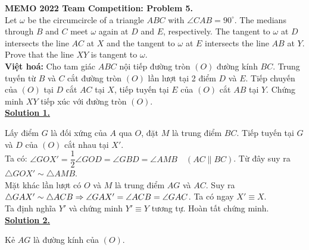 \documentclass[12pt,a4paper]{article}
\begin{document}
\setlength{\parindent}{0pt}
	
\textbf{MEMO 2022 Team Competition: Problem 5.} \\

Let $\omega$ be the circumcircle of a triangle $ABC$ with $\angle CAB=90^{\circ}$. The medians through $B$ and $C$ meet $\omega$ again at $D$ and $E$, respectively. The tangent to $\omega$ at $D$ intersects the line $AC$ at $X$ and the tangent to $\omega$ at $E$ intersects the line $AB$ at $Y$. Prove that the line $XY$ is tangent to $\omega$.\\

\textbf{Việt hoá:} Cho tam giác $ABC$ nội tiếp đường tròn $(O)$ đường kính $BC$. Trung tuyến từ $B$ và $C$ cắt đường tròn $(O)$ lần lượt tại 2 điểm $D$ và $E$. Tiếp chuyến của $(O)$ tại $D$ cắt $AC$ tại $X$, tiếp tuyến tại $E$ của $(O)$ cắt $AB$ tại $Y$. Chứng minh $XY$ tiếp xúc với đường tròn $(O)$.\\

\textbf{\underline{Solution 1.}}

Lấy điểm $G$ là đối xứng của $A$ qua $O$, đặt $M$ là trung điểm $BC$. Tiếp tuyến tại $G$ và $D$ của $(O)$ cắt nhau tại $X'$.\\

Ta có: $\angle GOX'=\dfrac{1}{2}\angle GOD=\angle GBD=\angle AMB\quad(AC\parallel BC)$. Từ đây suy ra $\triangle GOX'\sim\triangle AMB$. \\

Mặt khác lần lượt có $O$ và $M$ là trung điểm $AG$ và $AC$. Suy ra $\triangle GAX'\sim\triangle ACB\newline\Rightarrow\angle GAX'=\angle ACB=\angle GAC$. Ta có ngay $X'\equiv X$.\\

Ta định nghĩa $Y'$ và chứng minh $Y'\equiv Y$ tương tự. Hoàn tất chứng minh.\bigskip\\

\textbf{\underline{Solution 2.}}

Kẻ $AG$ là đường kính của $(O)$.
\end{document}

